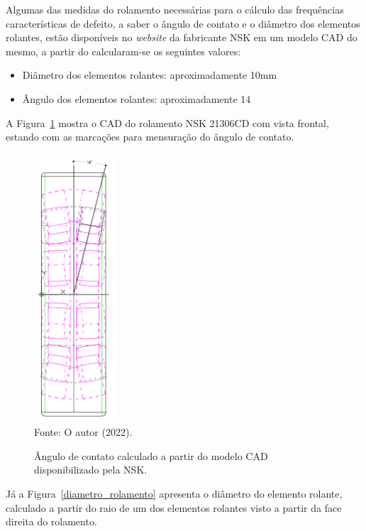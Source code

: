 \documentclass[
	12pt,				
	oneside,			
	a4paper,			
	english,			
	brazil,			
	]{abntex2ppgsi}
\begin{document}
Algumas das medidas do rolamento necessárias para o cálculo das frequências características de defeito, a saber o ângulo de contato e o diâmetro dos elementos rolantes, estão disponíveis no \textit{website} da fabricante NSK em um modelo CAD do mesmo, a partir do calcularam-se os seguintes valores:

\begin{itemize}
	\item Diâmetro dos elementos rolantes: aproximadamente 10\si{\mm}
	\item Ângulo dos elementos rolantes: aproximadamente 14\textdegree
\end{itemize}

A Figura~\ref{angulo_de_contato} mostra o CAD do rolamento NSK 21306CD com vista frontal, estando com as marcações para mensuração do ângulo de contato. 

\begin{figure}[H]
\centering
\caption {Ângulo de contato calculado a partir do modelo CAD disponibilizado pela NSK.}
\includegraphics[width=\textwidth,height=100mm,keepaspectratio]{angulo_de_contato} \\
Fonte: O autor (2022).
\label{angulo_de_contato}
\end{figure} 

Já a Figura~\ref{diametro_rolamento} apresenta o diâmetro do elemento rolante, calculado a partir do raio de um dos elementos rolantes visto a partir da face direita do rolamento. 
\end{document}
